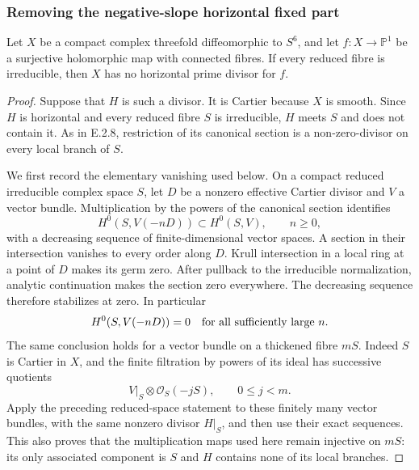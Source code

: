 \subsubsection*{Removing the negative-slope horizontal fixed part}

\begin{proposition}
Let $X$ be a compact complex threefold diffeomorphic to $S^6$,
and let $f:X\to\mathbb P^1$ be a surjective holomorphic map
with connected fibres.  If every reduced fibre is irreducible,
then $X$ has no horizontal prime divisor for $f$.
\end{proposition}
\begin{proof}
Suppose that $H$ is such a divisor.  It is Cartier because
$X$ is smooth.  Since $H$ is horizontal and every reduced
fibre $S$ is irreducible, $H$ meets $S$ and does not contain
it.  As in E.2.8, restriction of its canonical section is a
non-zero-divisor on every local branch of $S$.

We first record the elementary vanishing used below.  On a
compact reduced irreducible complex space $S$, let $D$ be a
nonzero effective Cartier divisor and $V$ a vector bundle.
Multiplication by the powers of the canonical section
identifies
\[
 H^0(S,V(-nD))\subset H^0(S,V),\qquad n\ge0,
\]
with a decreasing sequence of finite-dimensional vector
spaces.  A section in their intersection vanishes to every
order along $D$.  Krull intersection in a local ring at a
point of $D$ makes its germ zero.  After pullback to the
irreducible normalization, analytic continuation makes the
section zero everywhere.  The decreasing sequence therefore
stabilizes at zero.  In particular
\[
 H^0(S,V(-nD))=0\quad\hbox{for all sufficiently large }n.
\]
The same conclusion holds for a vector bundle on a thickened
fibre $mS$.  Indeed $S$ is Cartier in $X$, and the finite
filtration by powers of its ideal has successive quotients
\[
 V|_S\otimes\mathcal O_S(-jS),\qquad 0\le j<m.
\]
Apply the preceding reduced-space statement to these finitely
many vector bundles, with the same nonzero divisor $H|_S$,
and then use their exact sequences.  This also proves that
the multiplication maps used here remain injective on $mS$:
its only associated component is $S$ and $H$ contains none
of its local branches.


\end{proof}
